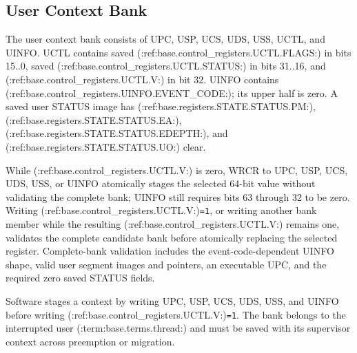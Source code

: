 \subsection{User Context Bank}
The user context bank consists of UPC, USP, UCS, UDS, USS, UCTL, and UINFO. UCTL contains saved (:ref:base.control_registers.UCTL.FLAGS:) in bits 15..0, saved (:ref:base.control_registers.UCTL.STATUS:) in bits 31..16, and (:ref:base.control_registers.UCTL.V:) in bit 32. UINFO contains (:ref:base.control_registers.UINFO.EVENT_CODE:); its upper half is zero. A saved user STATUS image has (:ref:base.registers.STATE.STATUS.PM:), (:ref:base.registers.STATE.STATUS.EA:), (:ref:base.registers.STATE.STATUS.EDEPTH:), and (:ref:base.registers.STATE.STATUS.UO:) clear.

While (:ref:base.control_registers.UCTL.V:) is zero, WRCR to UPC, USP, UCS, UDS, USS, or UINFO atomically stages the selected 64-bit value without
validating the complete bank; UINFO still requires bits 63 through 32 to be zero. Writing (:ref:base.control_registers.UCTL.V:)\texttt{=1}, or writing another
bank member while the resulting (:ref:base.control_registers.UCTL.V:) remains one, validates the complete candidate bank before atomically replacing the
selected register. Complete-bank validation includes the event-code-dependent UINFO shape, valid user segment images and pointers, an
executable UPC, and the required zero saved STATUS fields.

Software stages a context by writing UPC, USP, UCS, UDS, USS, and UINFO before writing (:ref:base.control_registers.UCTL.V:)\texttt{=1}. The bank belongs
to the interrupted user (:term:base.terms.thread:) and must be saved with its supervisor context across preemption or migration.
